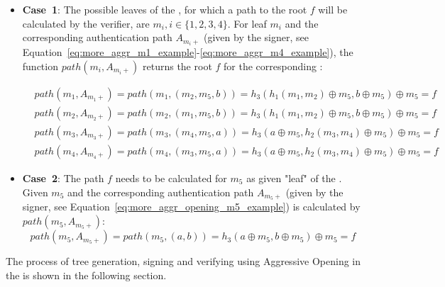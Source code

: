 \begin{itemize}
\item \textbf{Case~1}: The possible leaves of the \tfblock, for which a path to the root $f$ will be calculated by the verifier, are $m_i, i \in \{1,2,3,4\}$. For leaf $m_i$ and the corresponding authentication path $A_{m_i+}$ (given by the signer, see Equation~\ref{eq:more_aggr_m1_example}-\ref{eq:more_aggr_m4_example}), the function $path(m_i,A_{m_i+})$ returns the root $f$ for the corresponding \tfblock:

\begin{align}
&path(m_1, A_{m_1+}) = path(m_1, (m_2, m_5, b)) = h_3(h_1(m_1, m_2) \oplus m_5, b \oplus m_5) \oplus m_5 = f \label{eq:more_aggr_path_m1}\\
&path(m_2, A_{m_2+}) = path(m_2, (m_1, m_5, b)) = h_3(h_1(m_1, m_2) \oplus m_5, b \oplus m_5) \oplus m_5 = f\\
&path(m_3, A_{m_3+}) = path(m_3, (m_4, m_5, a)) = h_3(a \oplus m_5, h_2(m_3, m_4) \oplus m_5) \oplus m_5 = f \\
&path(m_4, A_{m_4+}) = path(m_4, (m_3, m_5, a)) = h_3(a \oplus m_5, h_2(m_3, m_4) \oplus m_5) \oplus m_5 = f \label{eq:more_aggr_path_m4}
\end{align}

\item \textbf{Case~2}: The path $f$ needs to be calculated for $m_5$ as given "leaf" of the \tfblock. Given $m_5$ and the corresponding authentication path $A_{m_5+}$ (given by the signer, see Equation~\ref{eq:more_aggr_opening_m5_example}) is calculated by $path(m_5, A_{m_5+})$:
\begin{equation}
\label{eq:more_aggr_path_m5}
path(m_5, A_{m_5+}) =  path(m_5, (a,b)) = h_3(a \oplus m_5, b \oplus m_5) \oplus m_5 = f
\end{equation}
\end{itemize}
The process of tree generation, signing and verifying using Aggressive Opening in the \extree is shown in the following section. 


